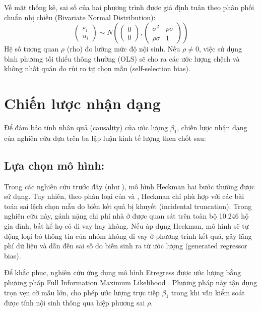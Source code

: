 \documentclass[12pt,a4paper]{report}
\begin{document}
Về mặt thống kê, sai số của hai phương trình được giả định tuân theo phân phối chuẩn nhị chiều (Bivariate Normal Distribution):
\begin{equation}
	\begin{pmatrix} \varepsilon_i \\ u_i \end{pmatrix} \sim N \left( \begin{pmatrix} 0 \\ 0 \end{pmatrix}, \begin{pmatrix} \sigma^2 & \rho\sigma \\ \rho\sigma & 1 \end{pmatrix} \right)
\end{equation}
Hệ số tương quan $\rho$ (rho) đo lường mức độ nội sinh. Nếu $\rho \neq 0$, việc sử dụng bình phương tối thiểu thông thường (OLS) sẽ cho ra các ước lượng chệch và không nhất quán do rủi ro tự chọn mẫu (self-selection bias).


\section{Chiến lược nhận dạng}

Để đảm bảo tính nhân quả (causality) của ước lượng $\beta_1$, chiến lược nhận dạng của nghiên cứu dựa trên ba lập luận kinh tế lượng then chốt sau:

\subsection{Lựa chọn mô hình:}
Trong các nghiên cứu trước đây (như \textcite{BuiTruong2023}), mô hình Heckman hai bước \parencite{Heckman1979} thường được sử dụng. Tuy nhiên, theo phân loại của \textcite{Maddala1983} và \textcite{Wooldridge2010}, Heckman chỉ phù hợp với các bài toán sai lệch chọn mẫu do biến kết quả bị khuyết (incidental truncation). Trong nghiên cứu này, gánh nặng chi phí nhà ở được quan sát trên toàn bộ 10.246 hộ gia đình, bất kể họ có đi vay hay không. Nếu áp dụng Heckman, mô hình sẽ tự động loại bỏ thông tin của nhóm không đi vay ở phương trình kết quả, gây lãng phí dữ liệu và dẫn đến sai số do biến sinh ra từ ước lượng (generated regressor bias).

Để khắc phục, nghiên cứu ứng dụng mô hình Etregress được ước lượng bằng phương pháp Full Information Maximum Likelihood \parencite{StataEtregress2025}. Phương pháp này tận dụng trọn vẹn cỡ mẫu lớn, cho phép ước lượng trực tiếp $\beta_1$ trong khi vẫn kiểm soát được tính nội sinh thông qua hiệp phương sai $\rho$.
\end{document}
